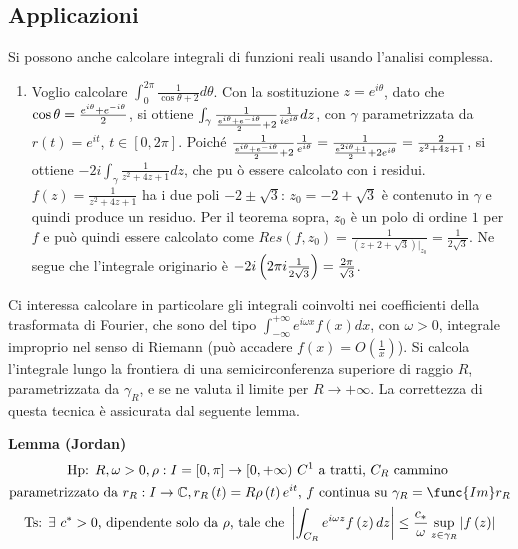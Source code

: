 \documentclass{article}
\begin{document}
\subsection{Applicazioni}

Si possono anche calcolare integrali di funzioni reali usando l'analisi
complessa.

\begin{enumerate}
\item Voglio calcolare $\int_{0}^{2\pi }\frac{1}{\cos \theta +2}d\theta $.
Con la sostituzione $z=e^{i\theta }$, dato che $\cos \theta =\frac{%
e^{i\theta }+e^{-i\theta }}{2}$, si ottiene $\int_{\gamma }\frac{1}{\frac{%
e^{i\theta }+e^{-i\theta }}{2}+2}\frac{1}{ie^{i\theta }}dz$, con $\gamma $
parametrizzata da $r\left( t\right) =e^{it}$, $t\in \left[ 0,2\pi \right] $.
Poich\'{e} $\frac{1}{\frac{e^{i\theta }+e^{-i\theta }}{2}+2}\frac{1}{%
e^{i\theta }}=\frac{1}{\frac{e^{2i\theta }+1}{2}+2e^{i\theta }}=\frac{2}{%
z^{2}+4z+1}$, si ottiene $-2i\int_{\gamma }\frac{1}{z^{2}+4z+1}dz$, che pu%
\`{o} essere calcolato con i residui. $f\left( z\right) =\frac{1}{z^{2}+4z+1}
$ ha i due poli $-2\pm \sqrt{3}$: $z_{0}=-2+\sqrt{3}$ \`{e} contenuto in $%
\gamma $ e quindi produce un residuo. Per il teorema sopra, $z_{0}$ \`{e} un
polo di ordine $1$ per $f$ e pu\`{o} quindi essere calcolato come $Res\left(
f,z_{0}\right) =\frac{1}{\left( z+2+\sqrt{3}\right) |_{z_{0}}}=\frac{1}{2%
\sqrt{3}}$. Ne segue che l'integrale originario \`{e} $-2i\left( 2\pi i\frac{%
1}{2\sqrt{3}}\right) =\frac{2\pi }{\sqrt{3}}$.
\end{enumerate}

Ci interessa calcolare in particolare gli integrali coinvolti nei
coefficienti della trasformata di Fourier, che sono del tipo $\int_{-\infty
}^{+\infty }e^{i\omega x}f\left( x\right) dx$, con $\omega >0$, integrale
improprio nel senso di Riemann (pu\`{o} accadere $f\left( x\right) =O\left( 
\frac{1}{x}\right) $). Si calcola l'integrale lungo la frontiera di una
semicirconferenza superiore di raggio $R$, parametrizzata da $\gamma _{R}$,
e se ne valuta il limite per $R\rightarrow +\infty $. La correttezza di
questa tecnica \`{e} assicurata dal seguente lemma.

\textbf{Lemma (Jordan)}%
\begin{gather*}
\text{Hp: }R,\omega >0,\rho :I=\left[ 0,\pi \right] \rightarrow \lbrack
0,+\infty )\text{ }C^{1}\text{ a tratti, }C_{R}\text{ cammino } \\
\text{parametrizzato da }r_{R}:I\rightarrow 
\mathbb{C}
,r_{R}\left( t\right) =R\rho \left( t\right) e^{it}\text{, }f\text{ continua
su }\gamma _{R}=\func{Im}r_{R} \\
\text{Ts: }\exists \text{ }c^{\ast }>0\text{, dipendente solo da }\rho \text{%
, tale che }\left\vert \int_{C_{R}}e^{i\omega z}f\left( z\right)
dz\right\vert \leq \frac{c_{\ast }}{\omega }\sup_{z\in \gamma
_{R}}\left\vert f\left( z\right) \right\vert
\end{gather*}
\end{document}
